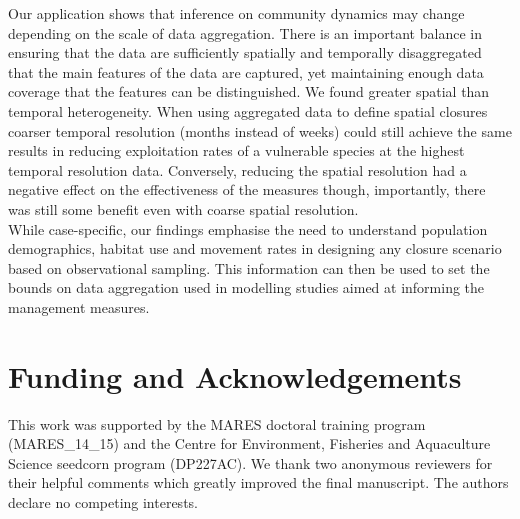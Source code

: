 \documentclass[preprint]{elsarticle}
\begin{document}
Our application shows that inference on community dynamics may change depending
on the scale of data aggregation. There is an important balance in ensuring
that the data are sufficiently spatially and temporally disaggregated that the
main features of the data are captured, yet maintaining enough data coverage
that the features can be distinguished. We found greater spatial than temporal
heterogeneity. When using aggregated data to define spatial closures coarser
temporal resolution (months instead of weeks) could still achieve the same
results in reducing exploitation rates of a vulnerable species at the highest
temporal resolution data. Conversely, reducing the spatial resolution had a
negative effect on the effectiveness of the measures though, importantly, there
was still some benefit even with coarse spatial resolution. \\

While case-specific, our findings emphasise the need to understand population
demographics, habitat use and movement rates in designing any closure scenario
based on observational sampling. This information can then be used to set the
bounds on data aggregation used in modelling studies aimed at informing the
management measures. \\ 

\section*{Funding and Acknowledgements} This work was supported by the MARES
doctoral training program (MARES\_14\_15) and the Centre for Environment,
Fisheries and Aquaculture Science seedcorn program (DP227AC). We thank
	two anonymous reviewers for their helpful comments which greatly
	improved the final manuscript. The authors declare no competing
interests.

\newpage



\clearpage


\clearpage




\clearpage

\end{document}
